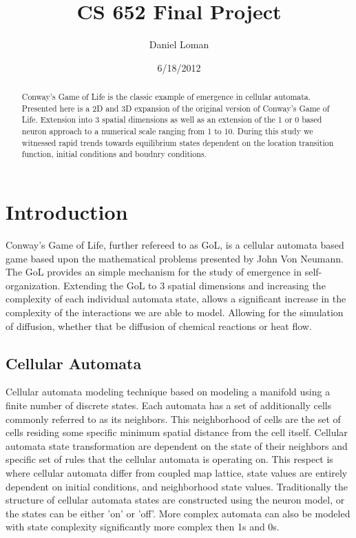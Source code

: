 \documentclass[11pt,twocolumn]{article}
\title{\textbf{CS 652 Final Project }}
\author{Daniel Loman}
\date{6/18/2012}
\begin{document}
\maketitle
\begin{abstract}
Conway's Game of Life is the classic example of emergence in cellular automata. Presented here is a 2D and 3D expansion of the original version of Conway's Game of Life. Extension into 3 spatial dimensions as well as an extension of the 1 or 0 based neuron approach to a numerical scale ranging from 1 to 10. During this study we witnessed rapid trends towards equilibrium states dependent on the location transition function, initial conditions and boudnry conditions.
\end{abstract}
\section{Introduction}
Conway's Game of Life, further refereed to as GoL, is a cellular automata based game based upon the mathematical problems presented by John Von Neumann. The GoL provides an simple mechanism for the study of emergence in self-organization.\cite{arc02}
Extending the GoL to 3 spatial dimensions and increasing the complexity of each individual automata state, allows a significant increase in the complexity of the interactions we are able to model. 
Allowing for the simulation of diffusion, whether that be diffusion of chemical reactions or heat flow.  
\subsection{Cellular Automata}
 Cellular automata modeling technique based on modeling a manifold 
 using a finite number of discrete states. 
 Each automata has a set of additionally cells commonly referred to as its neighbors.\cite{boc} 
 This neighborhood of cells are the set of cells residing some specific minimum spatial distance from the cell itself. 
 Cellular automata state transformation are dependent on the state of their neighbors and specific set of rules that the cellular automata is operating on.\cite{guinot}
 This respect is where cellular automata differ from coupled map lattice, state values are entirely dependent on initial conditions, and neighborhood state values.
 Traditionally the structure of cellular automata states are constructed using the neuron model, or the states can be either 'on' or 'off'. 
 More complex automata can also be modeled with state complexity significantly more complex then 1s and 0s.\cite{wolfram}
\end{document}
